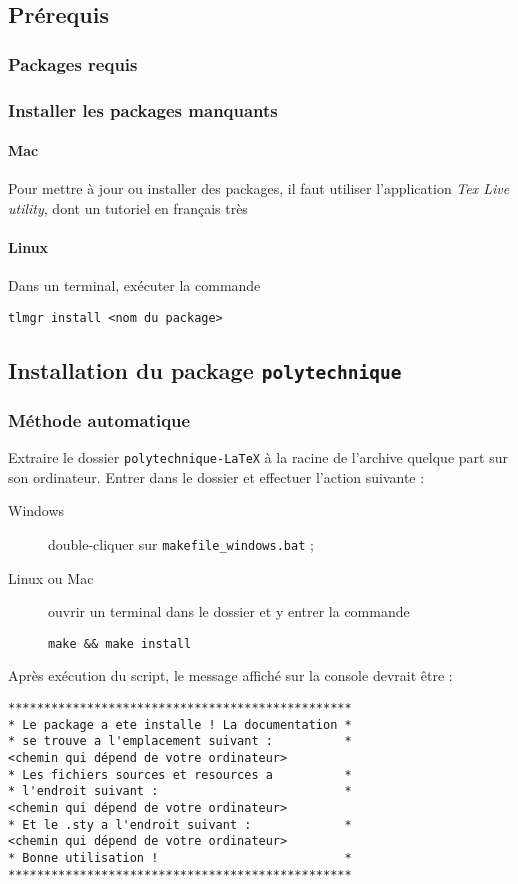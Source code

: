 \documentclass[a4paper,12pt,twoside]{article}
\begin{document}
\subsection{Prérequis}

\subsubsection{Packages requis}



\subsubsection{Installer les packages manquants}


\paragraph{Mac} Pour mettre à jour ou installer des packages, il faut utiliser l'application \emph{Tex Live utility}, dont un tutoriel en français très 
\paragraph{Linux} Dans un terminal, exécuter la commande 
\begin{verbatim}
tlmgr install <nom du package>
\end{verbatim}


\subsection{Installation du package \texttt{polytechnique}}

\subsubsection{Méthode automatique}



Extraire le dossier \texttt{polytechnique-LaTeX} à la racine de l'archive quelque part sur son ordinateur. Entrer dans le dossier et effectuer l'action suivante :
\begin{description}
\item[Windows] double-cliquer sur \texttt{makefile\_windows.bat} ;
\item[Linux ou Mac] ouvrir un terminal dans le dossier et y entrer la commande
\begin{verbatim}
make && make install
\end{verbatim}
\end{description}
Après exécution du script, le message affiché sur la console devrait être :
\begin{verbatim}
************************************************
* Le package a ete installe ! La documentation *
* se trouve a l'emplacement suivant :          *
<chemin qui dépend de votre ordinateur>
* Les fichiers sources et resources a          *
* l'endroit suivant :                          *
<chemin qui dépend de votre ordinateur>
* Et le .sty a l'endroit suivant :             *
<chemin qui dépend de votre ordinateur>
* Bonne utilisation !                          *
************************************************
\end{verbatim}
\end{document}
